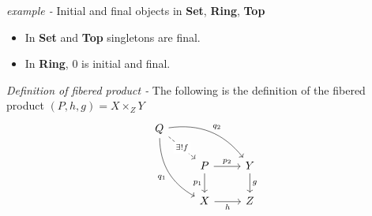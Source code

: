 \documentclass[11pt]{article}
\theoremstyle{definition}
\begin{document}
    \emph{example - } Initial and final objects in \textbf{Set}, \textbf{Ring}, \textbf{Top}

    \begin{itemize}
        \item In \textbf{Set} and \textbf{Top} singletons are final.
        \item In \textbf{Ring}, \(0\) is initial and final.
    \end{itemize}

    \emph{Definition of fibered product - } The following is the definition of the fibered product \((P,h,g) = X \times_Z Y\)
    \begin{equation*}
        \begin{tikzcd}
            Q
            \arrow[bend left]{drr}{q_2}
            \arrow[bend right,swap]{ddr}{q_1}
            \arrow[dashed]{dr}[description]{\exists ! f} & & \\
            & P \arrow{r}{p_2} \arrow{d}[swap]{p_1}
            & Y \arrow{d}{g} \\
            & X \arrow[swap]{r}{h}
            & Z
            \end{tikzcd}
    \end{equation*}
\end{document}
